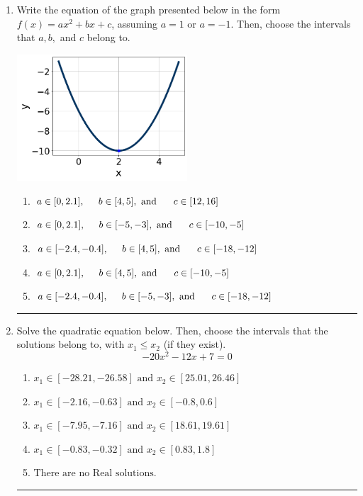 \documentclass[14pt]{extbook}
\newcommand{\litem}[1]{\item#1\hspace*{-1cm}\rule{\textwidth}{0.4pt}}
\begin{document}
\begin{enumerate}
{\begin{enumerate}[label=\Alph*.]
\end{enumerate} }
\litem{
Write the equation of the graph presented below in the form $f(x)=ax^2+bx+c$, assuming  $a=1$ or $a=-1$. Then, choose the intervals that $a, b,$ and $c$ belong to.
\begin{center}
    \includegraphics[width=0.5\textwidth]{../Figures/quadraticGraphToEquationCopyB.png}
\end{center}
\begin{enumerate}[label=\Alph*.]
\item \( a \in [0, 2.1], \hspace*{5mm} b \in [4, 5], \text{ and } \hspace*{5mm} c \in [12, 16] \)
\item \( a \in [0, 2.1], \hspace*{5mm} b \in [-5, -3], \text{ and } \hspace*{5mm} c \in [-10, -5] \)
\item \( a \in [-2.4, -0.4], \hspace*{5mm} b \in [4, 5], \text{ and } \hspace*{5mm} c \in [-18, -12] \)
\item \( a \in [0, 2.1], \hspace*{5mm} b \in [4, 5], \text{ and } \hspace*{5mm} c \in [-10, -5] \)
\item \( a \in [-2.4, -0.4], \hspace*{5mm} b \in [-5, -3], \text{ and } \hspace*{5mm} c \in [-18, -12] \)

\end{enumerate} }
\litem{
Solve the quadratic equation below. Then, choose the intervals that the solutions belong to, with $x_1 \leq x_2$ (if they exist).\[ -20x^{2} -12 x + 7 = 0 \]\begin{enumerate}[label=\Alph*.]
\item \( x_1 \in [-28.21, -26.58] \text{ and } x_2 \in [25.01, 26.46] \)
\item \( x_1 \in [-2.16, -0.63] \text{ and } x_2 \in [-0.8, 0.6] \)
\item \( x_1 \in [-7.95, -7.16] \text{ and } x_2 \in [18.61, 19.61] \)
\item \( x_1 \in [-0.83, -0.32] \text{ and } x_2 \in [0.83, 1.8] \)
\item \( \text{There are no Real solutions.} \)


\end{enumerate}}
\end{enumerate}
\end{document}
